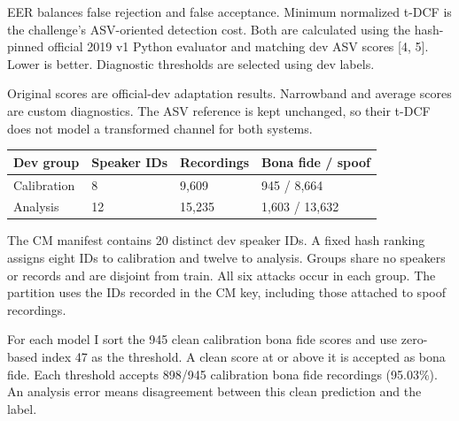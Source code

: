 \documentclass[10pt,a4paper]{article}
\begin{document}
EER balances false rejection and false acceptance. Minimum normalized t-DCF is the challenge's ASV-oriented detection cost. Both are calculated using the hash-pinned official 2019 v1 Python evaluator and matching dev ASV scores [4, 5]. Lower is better. Diagnostic thresholds are selected using dev labels.\par

Original scores are official-dev adaptation results. Narrowband and average scores are custom diagnostics. The ASV reference is kept unchanged, so their t-DCF does not model a transformed channel for both systems.\par

\par

\begin{center}\small

\begin{tabular}{@{}llll@{}}\toprule

Dev group & Speaker IDs & Recordings & Bona fide / spoof \\

\midrule

Calibration & 8 & 9,609 & 945 / 8,664 \\

Analysis & 12 & 15,235 & 1,603 / 13,632 \\

\bottomrule\end{tabular}\end{center}

The CM manifest contains 20 distinct dev speaker IDs. A fixed hash ranking assigns eight IDs to calibration and twelve to analysis. Groups share no speakers or records and are disjoint from train. All six attacks occur in each group. The partition uses the IDs recorded in the CM key, including those attached to spoof recordings.\par

For each model I sort the 945 clean calibration bona fide scores and use zero-based index 47 as the threshold. A clean score at or above it is accepted as bona fide. Each threshold accepts 898/945 calibration bona fide recordings (95.03\%). An analysis error means disagreement between this clean prediction and the label.\par
\end{document}
